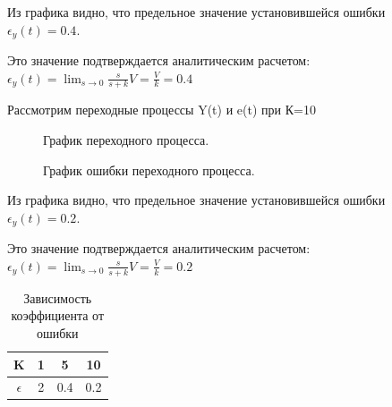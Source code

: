 \documentclass[a4paper, 11pt]{article}
\begin{document}
\normalsize{Из графика видно, что предельное значение установившейся ошибки \\ $\epsilon_y(t)=0.4$.

Это значение подтверждается аналитическим расчетом: \\ $\epsilon_y(t)=\lim_{s\to0}\frac{s}{s+k}V=\frac{V}{k}=0.4$

Рассмотрим переходные процессы Y(t) и e(t) при К=10}

\begin{figure}[h]
    \caption{График переходного процесса.}
    \label{two}
\end{figure}

\newpage

\begin{figure}[h]
    \caption{График ошибки переходного процесса.}
    \label{tree}
\end{figure}

\normalsize{Из графика видно, что предельное значение установившейся ошибки \\ $\epsilon_y(t)=0.2$.

Это значение подтверждается аналитическим расчетом: \\ $\epsilon_y(t)=\lim_{s\to0}\frac{s}{s+k}V=\frac{V}{k}=0.2$}

\begin{table}[h]
    \begin{center}
    \begin{tabular}{|c|c|c|c|}
    \hline
         K & 1 & 5 & 10 \\
         \hline
         $\epsilon$ & 2 & 0.4 & 0.2 \\
    \hline     
    \end{tabular}
    \caption{Зависимость коэффициента от ошибки}
    \label{tab:my_label}
    \end{center}
\end{table}
\end{document}
